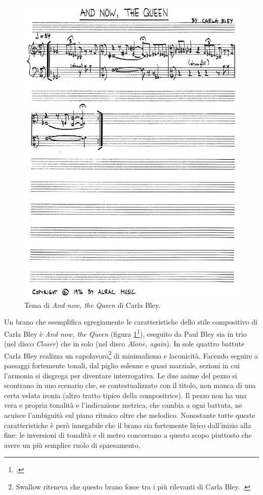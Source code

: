 \begin{figure}[h]
	\centering
	\includegraphics[width=\textwidth, clip,trim={0cm 25cm 0cm 0cm}]{screenshot005up}
	\caption{Tema di \textit{And now, the Queen} di Carla Bley.}
	\label{nowthequeen}
\end{figure}
Un brano che esemplifica egregiamente le caratteristiche dello stile compositivo di Carla Bley è \textit{And now, the Queen} (figura \ref{nowthequeen}\footcite{earlycomp}), eseguito da Paul Bley sia in trio (nel disco \textit{Closer}) che in solo (nel disco \textit{Alone, again}). In sole quattro battute Carla Bley realizza un capolavoro\footnote{Swallow riteneva che questo brano fosse tra i più rilevanti di Carla Bley. \cite[23]{carla}.} di minimalismo e laconicità. Facendo seguire a passaggi fortemente tonali, dal piglio solenne e quasi marziale, sezioni in cui l'armonia si disgrega per diventare interrogativa. Le due anime del pezzo si scontrano in uno scenario che, se contestualizzato con il titolo, non manca di una certa velata ironia (altro tratto tipico della compositrice). Il pezzo non ha una vera e propria tonalità e l'indicazione metrica, che cambia a ogni battuta, ne acuisce l'ambiguità sul piano ritmico oltre che melodico. Nonostante tutte queste caratteristiche è però innegabile che il brano sia fortemente lirico dall'inizio alla fine: le inversioni di tonalità e di metro concorrano a questo scopo piuttosto che avere un più semplice ruolo di spaesamento.\\
